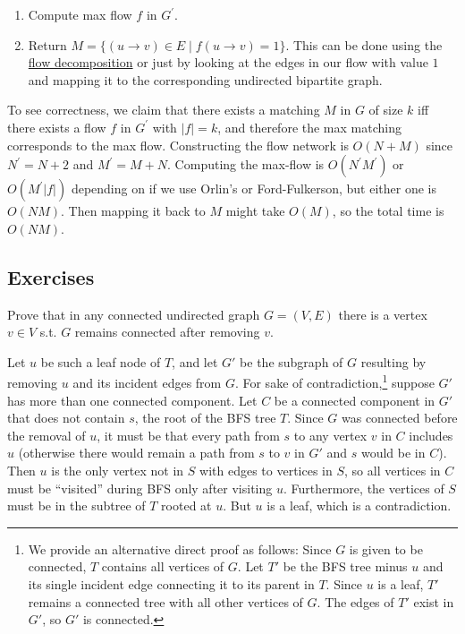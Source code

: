 \begin{example}
\begin{enumerate}
      \item Compute max flow $f$ in $G^\prime$. 
      \item Return $M = \{ (u \rightarrow v) \in E \mid f(u \rightarrow v) = 1 \}$. This can be done using the \hyperref[def:flow-decomposition]{flow decomposition} or just by looking at the edges in our flow with value $1$ and mapping it to the corresponding undirected bipartite graph. 
    \end{enumerate}
    To see correctness, we claim that there exists a matching $M$ in $G$ of size $k$ iff there exists a flow $f$ in $G^\prime$ with $|f|= k$, and therefore the max matching corresponds to the max flow. Constructing the flow network is $O(N + M)$ since $N^\prime = N + 2$ and $M^\prime = M + N$. Computing the max-flow is $O(N^\prime M^\prime)$ or $O(M^\prime |f|)$ depending on if we use Orlin's or Ford-Fulkerson, but either one is $O(NM)$. Then mapping it back to $M$ might take $O(M)$, so the total time is $O(NM)$. 
  \end{example}

\subsection{Exercises}

  \begin{exercise}
    Prove that in any connected undirected graph $G = (V, E)$ there is a vertex $v \in V$ s.t. $G$ remains connected after removing $v$. 
  \end{exercise}
  \begin{solution}
    Let $u$ be such a leaf node of $T$, and let $G'$ be the subgraph of $G$ resulting by removing $u$ and its incident edges from $G$.
    For sake of contradiction,\footnote{We provide an alternative direct proof as follows: Since $G$ is given to be connected, $T$ contains all vertices of $G$. Let $T'$ be the BFS tree minus $u$ and its single incident edge connecting it to its parent in $T$. Since $u$ is a leaf, $T'$ remains a connected tree with all other vertices of $G$. The edges of $T'$ exist in $G'$, so $G'$ is connected.} suppose $G'$ has more than one connected component.
    Let $C$ be a connected component in $G'$ that does not contain $s$, the root of the BFS tree $T$.
    Since $G$ was connected before the removal of $u$, it must be that every path from $s$ to any vertex $v$ in $C$ includes $u$ (otherwise there would remain a path from $s$ to $v$ in $G'$ and $s$ would be in $C$).
    Then $u$ is the only vertex not in $S$ with edges to vertices in $S$, so all vertices in $C$ must be ``visited'' during BFS only after visiting $u$. Furthermore, the vertices of $S$ must be in the subtree of $T$ rooted at $u$. But $u$ is a leaf, which is a contradiction.
  \end{solution}

